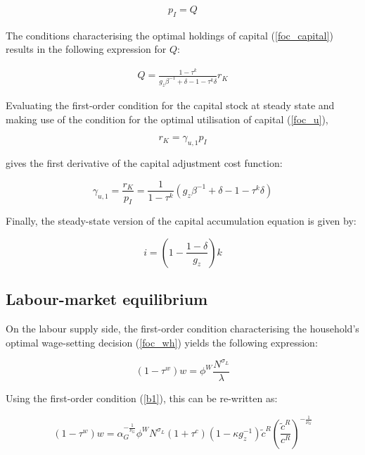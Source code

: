 \documentclass[a4paper,11pt]{article}
\numberwithin{equation}{section}
\begin{document}
	\begin{eqnarray}
	p_I=Q
	\end{eqnarray}
	
	The conditions characterising the optimal holdings of capital (\ref{foc_capital}) results in the following expression for $Q$:
	
	\begin{eqnarray}
	Q=\frac{1-\tau^k}{g_z\beta^{-1}+\delta-1-\tau^k\delta}r_K
	\end{eqnarray}
	
	Evaluating the first-order condition for the capital stock at steady state and making use of the condition for the optimal utilisation of capital (\ref{foc_u}),
	
	\begin{equation}
	r_K=\gamma_{u,1}p_I
	\end{equation}
	
	gives the first derivative of the capital adjustment cost function:
	
	\begin{equation} \label{b5}
	\gamma_{u,1}=\frac{r_K}{p_I}=\frac{1}{1-\tau^k}\left(g_z\beta^{-1}+\delta-1-\tau^k\delta\right)
	\end{equation}
	
	Finally, the steady-state version of the capital accumulation equation is given by:
	
	\begin{equation} \label{b6}
	i=\left(1-\frac{1-\delta}{g_z}\right)k
	\end{equation}
	
	\subsection{Labour-market equilibrium}
	
	On the labour supply side, the first-order condition characterising the household's optimal wage-setting decision (\ref{foc_wh}) yields the following expression:
	
	\begin{equation}
	\left(1-\tau^w\right)w=\phi^W\frac{N^{\sigma_L}}{\lambda}
	\end{equation}
	
	Using the first-order condition (\ref{b1}), this can be re-written as:
	
	\begin{equation}
	\left(1-\tau^w\right)w=\alpha_G^{-\frac{1}{\nu_G}}\phi^W N^{\sigma_L}\left(1+\tau^c\right)\left(1-\kappa g_z^{-1}\right)\tilde{c}^R\left(\frac{\tilde{c}^R}{c^R}\right)^{-\frac{1}{\nu_G}}
	\end{equation}
	
\end{document}

